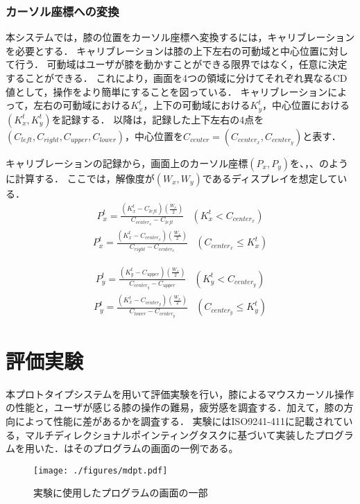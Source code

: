 \documentclass[submit, techrep]{ipsj}
\begin{document}
\subsubsection{カーソル座標への変換}
本システムでは，膝の位置をカーソル座標へ変換するには，キャリブレーションを必要とする．
キャリブレーションは膝の上下左右の可動域と中心位置に対して行う．
可動域はユーザが膝を動かすことができる限界ではなく，任意に決定することができる．
これにより，画面を4つの領域に分けてそれぞれ異なるCD値として，操作をより簡単にすることを図っている．
キャリブレーションによって，左右の可動域における$K^t_x$，上下の可動域における$K^t_y$，中心位置における$(K^t_x, K^t_y)$を記録する．
以降は，記録した上下左右の4点を$(C_{left},C_{right},C_{upper},C_{lower})$，中心位置を$C_{center}=(C_{center_x},  C_{center_y})$と表す．\par
キャリブレーションの記録から，画面上のカーソル座標$(P_x, P_y)$を、，、のように計算する．
ここでは，解像度が$(W_x, W_y)$であるディスプレイを想定している．
\begin{eqnarray}
	\label{eq:calc_px1}
	P^t_x = 
		\frac{(K^t_x - C_{left}) \left( \frac{W_x}{2} \right)}{C_{center_x} - C_{left}} & (K^t_x < C_{center_x})
\end{eqnarray}
\begin{eqnarray}
	\label{eq:calc_px2}
	P^t_x = 
		\frac{(K^t_x - C_{center_x}) \left( \frac{W_x}{2} \right)}{C_{right} - C_{center_x}} & (C_{center_x} \leq K^t_x) 
\end{eqnarray}

\begin{eqnarray}
	\label{eq:calc_py1}
	P^t_y = 
		\frac{(K^t_y - C_{upper}) \left( \frac{W_x}{2} \right)}{C_{center_y} - C_{upper}} & (K^t_y < C_{center_y}) 
\end{eqnarray}
\begin{eqnarray}
	\label{eq:calc_py2}
	P^t_y = 
		\frac{(K^t_x - C_{center_y}) \left( \frac{W_x}{2} \right)}{C_{lower} - C_{center_y}} & (C_{center_y} \leq K^t_y)
\end{eqnarray}
\section{評価実験}
本プロトタイプシステムを用いて評価実験を行い，膝によるマウスカーソル操作の性能と，ユーザが感じる膝の操作の難易，疲労感を調査する．加えて，膝の方向によって性能に差があるかを調査する．
実験にはISO9241-411\cite{9241411}に記載されている，マルチディレクショナルポインティングタスクに基づいて実装したプログラムを用いた．はそのプログラムの画面の一例である。
\begin{figure}[tb]
	\begin{center}
		\texttt{[image: ./figures/mdpt.pdf]}
	\end{center}
	\caption{実験に使用したプログラムの画面の一部}
	\label{img:mdpt}
\end{figure}
\end{document}
